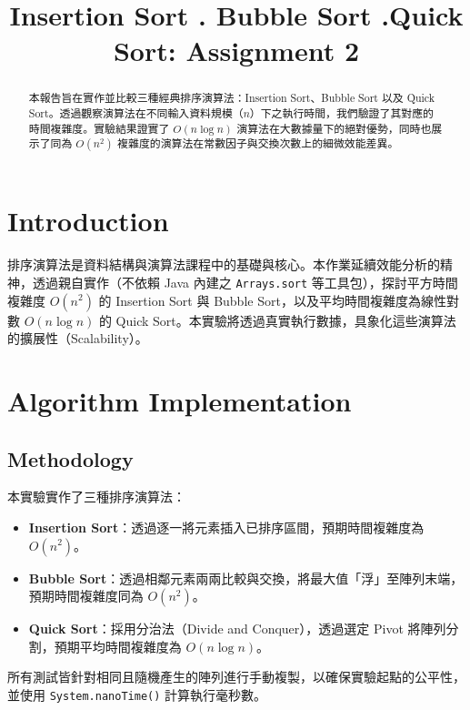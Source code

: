 \documentclass[conference]{IEEEtran}
\begin{document}
\title{     Insertion Sort . Bubble Sort .Quick Sort: Assignment 2}

\author{
}

\maketitle

\begin{abstract}
本報告旨在實作並比較三種經典排序演算法：Insertion Sort、Bubble Sort 以及 Quick Sort。透過觀察演算法在不同輸入資料規模（$n$）下之執行時間，我們驗證了其對應的時間複雜度。實驗結果證實了 $O(n \log n)$ 演算法在大數據量下的絕對優勢，同時也展示了同為 $O(n^2)$ 複雜度的演算法在常數因子與交換次數上的細微效能差異。
\end{abstract}

\section{Introduction}
排序演算法是資料結構與演算法課程中的基礎與核心。本作業延續效能分析的精神，透過親自實作（不依賴 Java 內建之 \texttt{Arrays.sort} 等工具包），探討平方時間複雜度 $O(n^2)$ 的 Insertion Sort 與 Bubble Sort，以及平均時間複雜度為線性對數 $O(n \log n)$ 的 Quick Sort。本實驗將透過真實執行數據，具象化這些演算法的擴展性（Scalability）。

\section{Algorithm Implementation}
\subsection{Methodology}
本實驗實作了三種排序演算法：
\begin{itemize}
    \item \textbf{Insertion Sort}：透過逐一將元素插入已排序區間，預期時間複雜度為 $O(n^2)$。
    \item \textbf{Bubble Sort}：透過相鄰元素兩兩比較與交換，將最大值「浮」至陣列末端，預期時間複雜度同為 $O(n^2)$。
    \item \textbf{Quick Sort}：採用分治法（Divide and Conquer），透過選定 Pivot 將陣列分割，預期平均時間複雜度為 $O(n \log n)$。
\end{itemize}
所有測試皆針對相同且隨機產生的陣列進行手動複製，以確保實驗起點的公平性，並使用 \texttt{System.nanoTime()} 計算執行毫秒數。
\end{document}

